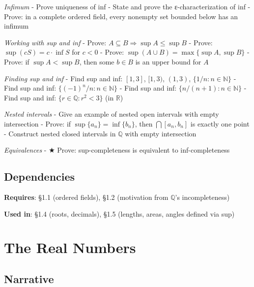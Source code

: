 \documentclass[
  10pt,
  letterpaper,
]{scrbook}
\newcommand{\NN}{\mathbb{N}}
\newcommand{\QQ}{\mathbb{Q}}
\newcommand{\RR}{\mathbb{R}}
\begin{document}
\emph{Infimum} - Prove uniqueness of inf - State and prove the
ε-characterization of inf - Prove: in a complete ordered field, every
nonempty set bounded below has an infimum

\emph{Working with sup and inf} - Prove:
\(A \subseteq B \Rightarrow \sup A \leq \sup B\) - Prove:
\(\sup(cS) = c \cdot \inf S\) for \(c < 0\) - Prove:
\(\sup(A \cup B) = \max\{\sup A, \sup B\}\) - Prove: if
\(\sup A < \sup B\), then some \(b \in B\) is an upper bound for \(A\)

\emph{Finding sup and inf} - Find sup and inf: \([1,3]\), \([1,3)\),
\((1,3)\), \(\{1/n : n \in \NN\}\) - Find sup and inf:
\(\{(-1)^n / n : n \in \NN\}\) - Find sup and inf:
\(\{n/(n+1) : n \in \NN\}\) - Find sup and inf:
\(\{r \in \QQ : r^2 < 3\}\) (in \(\RR\))

\emph{Nested intervals} - Give an example of nested open intervals with
empty intersection - Prove: if \(\sup\{a_n\} = \inf\{b_n\}\), then
\(\bigcap [a_n, b_n]\) is exactly one point - Construct nested closed
intervals in \(\QQ\) with empty intersection

\emph{Equivalences} - ★ Prove: sup-completeness is equivalent to
inf-completeness

\subsection{Dependencies}\label{dependencies-2}

\textbf{Requires}: §1.1 (ordered fields), §1.2 (motivation from
\(\QQ\)'s incompleteness)

\textbf{Used in}: §1.4 (roots, decimals), §1.5 (lengths, areas, angles
defined via sup)

\section{The Real Numbers}\label{the-real-numbers}

\subsection{Narrative}\label{narrative-3}
\end{document}
